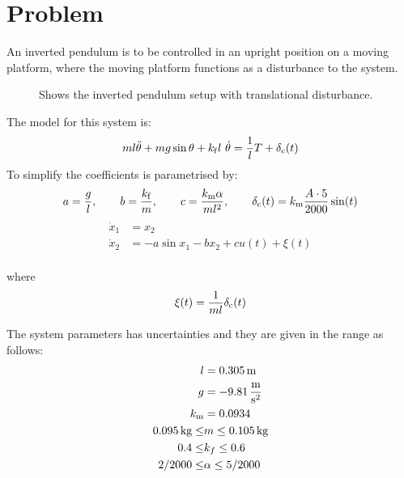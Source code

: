 \chapter{Problem}
An inverted pendulum is to be controlled in an upright position on a moving platform, where the moving platform functions as a disturbance to the system.
\begin{figure}[H]
        \centering
        \def\svgwidth{10cm}
        
        \caption{Shows the inverted pendulum setup with translational disturbance.}
        \label{fig:}
\end{figure}
The model for this system is:
\begin{equation}
        m l \Ddot{\theta} + m g \sin\theta + k_{\mathrm{f}}  l \ \dot{\theta} = \frac{1}{l}T + \delta_{\mathrm{c}}(t)
\end{equation}
To simplify the coefficients is parametrised by:
\begin{equation}
        a=\frac{g}{l}, \qquad b=\frac{k_{\mathrm{f}}}{m}, \qquad c= \frac{k_{\mathrm{m}}\alpha}{m l^2}, \qquad \delta_{\mathrm{c}}(t) = k_{\mathrm{m}} \frac{A\cdot5}{2000}\sin(t)
\end{equation}
\begin{equation}
\begin{split}
        \dot{x}_1 &= x_2\\
        \dot{x}_2 &= - a \sin x_1 - b x_2 + c u(t) + \xi(t)\\
\end{split}
\end{equation}

where
\begin{equation}
        \xi(t) = \frac{1}{m l} \delta_{\mathrm{c}}(t)
\end{equation}

The system parameters has uncertainties and they are given in the range as follows:
\begin{equation}
        \begin{split}
                l &= 0.305 \, \mathrm{m} \\
                g &= -9.81 \, \frac{\mathrm{m}}{\mathrm{s}^2}\\
                k_{\mathrm{m}} &= 0.0934 \\
                0.095 \, \text{kg} \leq & m \leq 0.105 \, \text{kg} \\
                0.4 \leq & k_f \leq 0.6 \\
                2/2000 \leq & \alpha \leq 5/2000 \\
                \nonumber
        \end{split}
\end{equation}

